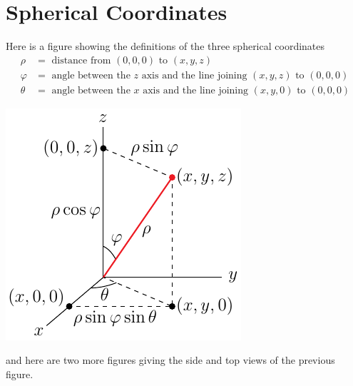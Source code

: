 \section{Spherical Coordinates}\label{ap:spherCoord}

Here is a figure showing the definitions of the 
three spherical coordinates 
\begin{align*}
\rho&=\text{ distance from }(0,0,0)\text{ to }(x,y,z)\\
\varphi&=\text{ angle between the $z$ axis and the line joining $(x,y,z)$ to $(0,0,0)$} \\
\theta&=\text{ angle between the $x$ axis and the line joining $(x,y,0)$ to $(0,0,0)$}
\end{align*}
\begin{efig}
\begin{center}
    \includegraphics{spherical.pdf}
\end{center}
\end{efig}
and here are two more figures giving the side and top views of the 
previous figure.
